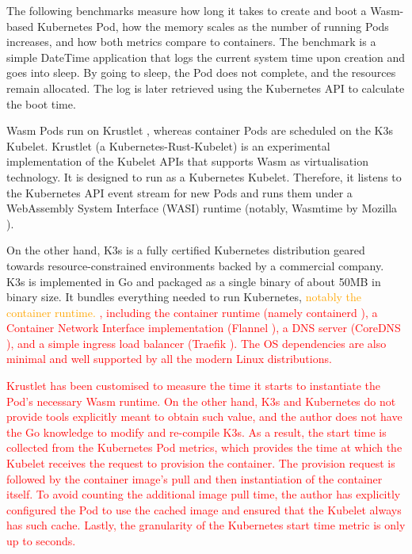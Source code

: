The following benchmarks measure how long it takes to create and boot a Wasm-based Kubernetes Pod, how the memory scales as the number of running Pods increases, and how both metrics compare to containers. The benchmark is a simple DateTime application that logs the current system time upon creation and goes into sleep. By going to sleep, the Pod does not complete, and the resources remain allocated. The log is later retrieved using the Kubernetes API to calculate the boot time. 

Wasm Pods run on Krustlet \cite{krustlet}, whereas container Pods are scheduled on the K3s \cite{k3s} Kubelet. Krustlet (a Kubernetes-Rust-Kubelet) is an experimental implementation of the Kubelet APIs that supports Wasm as virtualisation technology. It is designed to run as a Kubernetes Kubelet. Therefore, it listens to the Kubernetes API event stream for new Pods and runs them under a WebAssembly System Interface (WASI) runtime (notably, Wasmtime by Mozilla \cite{wasmtime}).

On the other hand, K3s is a fully certified Kubernetes distribution geared towards resource-constrained environments backed by a commercial company. K3s is implemented in Go and packaged as a single binary of about 50MB in binary size. It bundles everything needed to run Kubernetes, \textcolor{orange}{notably the container runtime.} \textcolor{red}{, including the container runtime (namely containerd \cite{containerd}), a Container Network Interface implementation (Flannel \cite{flannel}), a DNS server (CoreDNS \cite{coredns}), and a simple ingress load balancer (Traefik \cite{traefik}). The OS dependencies are also minimal and well supported by all the modern Linux distributions.}

\textcolor{red}{Krustlet has been customised to measure the time it starts to instantiate the Pod's necessary Wasm runtime. On the other hand, K3s and Kubernetes do not provide tools explicitly meant to obtain such value, and the author does not have the Go knowledge to modify and re-compile K3s. As a result, the start time is collected from the Kubernetes Pod metrics, which provides the time at which the Kubelet receives the request to provision the container. The provision request is followed by the container image's pull and then instantiation of the container itself. To avoid counting the additional image pull time, the author has explicitly configured the Pod to use the cached image and ensured that the Kubelet always has such cache. Lastly, the granularity of the Kubernetes start time metric is only up to seconds.}

